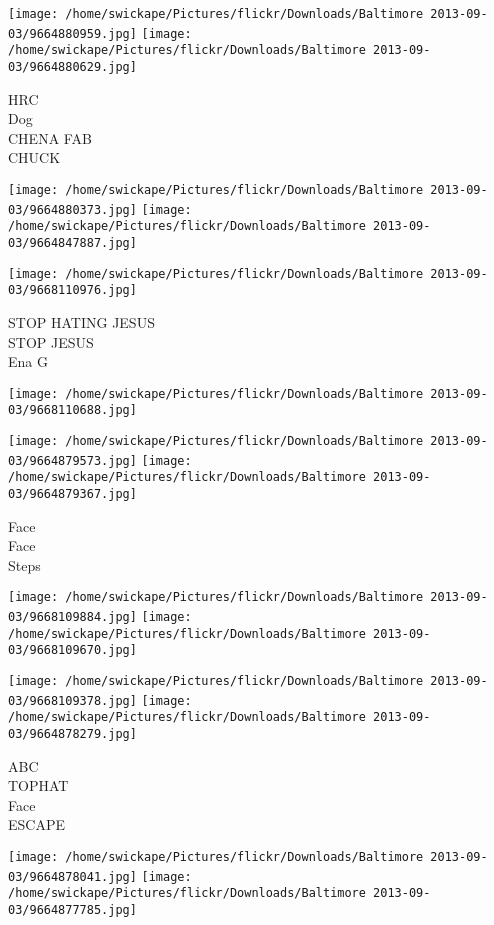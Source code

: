\documentclass[10pt,letterpaper]{article}
\begin{document}
\texttt{[image: /home/swickape/Pictures/flickr/Downloads/Baltimore 2013-09-03/9664880959.jpg]}
\texttt{[image: /home/swickape/Pictures/flickr/Downloads/Baltimore 2013-09-03/9664880629.jpg]}

HRC\\
Dog\\
CHENA FAB\\
CHUCK
\pagebreak

\texttt{[image: /home/swickape/Pictures/flickr/Downloads/Baltimore 2013-09-03/9664880373.jpg]}
\texttt{[image: /home/swickape/Pictures/flickr/Downloads/Baltimore 2013-09-03/9664847887.jpg]}

\texttt{[image: /home/swickape/Pictures/flickr/Downloads/Baltimore 2013-09-03/9668110976.jpg]}

STOP HATING JESUS\\
STOP JESUS\\
Ena G
\pagebreak

\texttt{[image: /home/swickape/Pictures/flickr/Downloads/Baltimore 2013-09-03/9668110688.jpg]}

\vspace{0.25in}
\texttt{[image: /home/swickape/Pictures/flickr/Downloads/Baltimore 2013-09-03/9664879573.jpg]}
\texttt{[image: /home/swickape/Pictures/flickr/Downloads/Baltimore 2013-09-03/9664879367.jpg]}

Face\\
Face\\
Steps
\pagebreak

\texttt{[image: /home/swickape/Pictures/flickr/Downloads/Baltimore 2013-09-03/9668109884.jpg]}
\texttt{[image: /home/swickape/Pictures/flickr/Downloads/Baltimore 2013-09-03/9668109670.jpg]}

\texttt{[image: /home/swickape/Pictures/flickr/Downloads/Baltimore 2013-09-03/9668109378.jpg]}
\texttt{[image: /home/swickape/Pictures/flickr/Downloads/Baltimore 2013-09-03/9664878279.jpg]}

ABC\\
TOPHAT\\
Face\\
ESCAPE
\pagebreak

\texttt{[image: /home/swickape/Pictures/flickr/Downloads/Baltimore 2013-09-03/9664878041.jpg]}
\texttt{[image: /home/swickape/Pictures/flickr/Downloads/Baltimore 2013-09-03/9664877785.jpg]}
\end{document}
